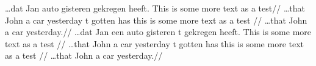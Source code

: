 \documentclass{article}
\begin{document}
\pex
\a
\begingl[aboveglbskip=\arrowheight]
\gla        \ldots dat Jan  auto gisteren    gekregen heeft. This is some more  text as a test//
\glb        \ldots that John a car  yesterday t  gotten has this is some more text as a test //
\glft       \ldots that John a car yesterday.//
\endgl
\a\begingl
\gla        \ldots dat Jan een auto gisteren t gekregen heeft. This is some more text as a test //
\glb        \ldots that John a car  yesterday t gotten has this is some more text as a test //
\glft       \ldots that John a car yesterday.//
\endgl
\xe
\end{document}
